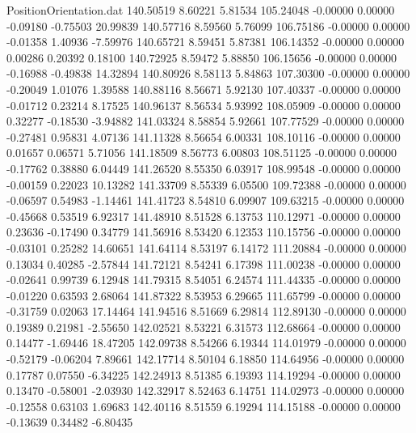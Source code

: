 \begin{filecontents}{PositionOrientation.dat}
 140.50519    8.60221    5.81534   105.24048   -0.00000    0.00000   -0.09180   -0.75503   20.99839
 140.57716    8.59560    5.76099   106.75186   -0.00000    0.00000   -0.01358    1.40936   -7.59976
 140.65721    8.59451    5.87381   106.14352   -0.00000    0.00000    0.00286    0.20392    0.18100
 140.72925    8.59472    5.88850   106.15656   -0.00000    0.00000   -0.16988   -0.49838   14.32894
 140.80926    8.58113    5.84863   107.30300   -0.00000    0.00000   -0.20049    1.01076    1.39588
 140.88116    8.56671    5.92130   107.40337   -0.00000    0.00000   -0.01712    0.23214    8.17525
 140.96137    8.56534    5.93992   108.05909   -0.00000    0.00000    0.32277   -0.18530   -3.94882
 141.03324    8.58854    5.92661   107.77529   -0.00000    0.00000   -0.27481    0.95831    4.07136
 141.11328    8.56654    6.00331   108.10116   -0.00000    0.00000    0.01657    0.06571    5.71056
 141.18509    8.56773    6.00803   108.51125   -0.00000    0.00000   -0.17762    0.38880    6.04449
 141.26520    8.55350    6.03917   108.99548   -0.00000    0.00000   -0.00159    0.22023   10.13282
 141.33709    8.55339    6.05500   109.72388   -0.00000    0.00000   -0.06597    0.54983   -1.14461
 141.41723    8.54810    6.09907   109.63215   -0.00000    0.00000   -0.45668    0.53519    6.92317
 141.48910    8.51528    6.13753   110.12971   -0.00000    0.00000    0.23636   -0.17490    0.34779
 141.56916    8.53420    6.12353   110.15756   -0.00000    0.00000   -0.03101    0.25282   14.60651
 141.64114    8.53197    6.14172   111.20884   -0.00000    0.00000    0.13034    0.40285   -2.57844
 141.72121    8.54241    6.17398   111.00238   -0.00000    0.00000   -0.02641    0.99739    6.12948
 141.79315    8.54051    6.24574   111.44335   -0.00000    0.00000   -0.01220    0.63593    2.68064
 141.87322    8.53953    6.29665   111.65799   -0.00000    0.00000   -0.31759    0.02063   17.14464
 141.94516    8.51669    6.29814   112.89130   -0.00000    0.00000    0.19389    0.21981   -2.55650
 142.02521    8.53221    6.31573   112.68664   -0.00000    0.00000    0.14477   -1.69446   18.47205
 142.09738    8.54266    6.19344   114.01979   -0.00000    0.00000   -0.52179   -0.06204    7.89661
 142.17714    8.50104    6.18850   114.64956   -0.00000    0.00000    0.17787    0.07550   -6.34225
 142.24913    8.51385    6.19393   114.19294   -0.00000    0.00000    0.13470   -0.58001   -2.03930
 142.32917    8.52463    6.14751   114.02973   -0.00000    0.00000   -0.12558    0.63103    1.69683
 142.40116    8.51559    6.19294   114.15188   -0.00000    0.00000   -0.13639    0.34482   -6.80435

\end{filecontents}
